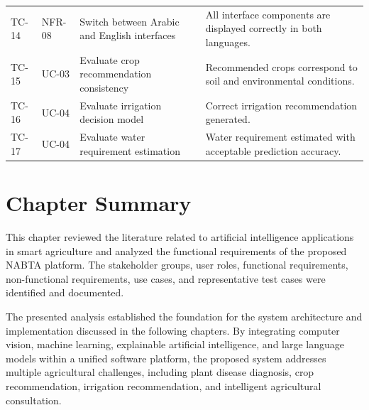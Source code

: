 \begin{table}[H]
\begin{tabularx}{\textwidth}{l l X X}
TC-14 & NFR-08 & Switch between Arabic and English interfaces & All interface components are displayed correctly in both languages.\\

TC-15 & UC-03 & Evaluate crop recommendation consistency & Recommended crops correspond to soil and environmental conditions.\\

TC-16 & UC-04 & Evaluate irrigation decision model & Correct irrigation recommendation generated.\\

TC-17 & UC-04 & Evaluate water requirement estimation & Water requirement estimated with acceptable prediction accuracy.\\

\bottomrule
\end{tabularx}
\end{table}

\section{Chapter Summary}
\label{sec:chapter2_summary}

This chapter reviewed the literature related to artificial intelligence applications in smart agriculture and analyzed the functional requirements of the proposed NABTA platform. The stakeholder groups, user roles, functional requirements, non-functional requirements, use cases, and representative test cases were identified and documented.

The presented analysis established the foundation for the system architecture and implementation discussed in the following chapters. By integrating computer vision, machine learning, explainable artificial intelligence, and large language models within a unified software platform, the proposed system addresses multiple agricultural challenges, including plant disease diagnosis, crop recommendation, irrigation recommendation, and intelligent agricultural consultation.
